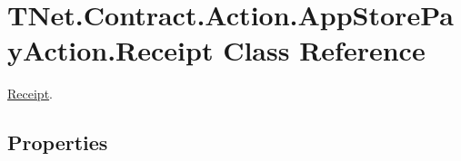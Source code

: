 \hypertarget{class_t_net_1_1_contract_1_1_action_1_1_app_store_pay_action_1_1_receipt}{}\section{T\+Net.\+Contract.\+Action.\+App\+Store\+Pay\+Action.\+Receipt Class Reference}
\label{class_t_net_1_1_contract_1_1_action_1_1_app_store_pay_action_1_1_receipt}


\mbox{\hyperlink{class_t_net_1_1_contract_1_1_action_1_1_app_store_pay_action_1_1_receipt}{Receipt}}.  


\subsection*{Properties}
